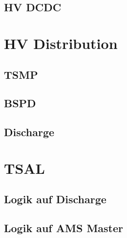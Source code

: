 \subsection{HV DCDC}

\section{HV Distribution}

\subsection{TSMP}

\subsection{BSPD}

\subsection{Discharge}

\section{TSAL}

\subsection{Logik auf Discharge}

\subsection{Logik auf AMS Master}